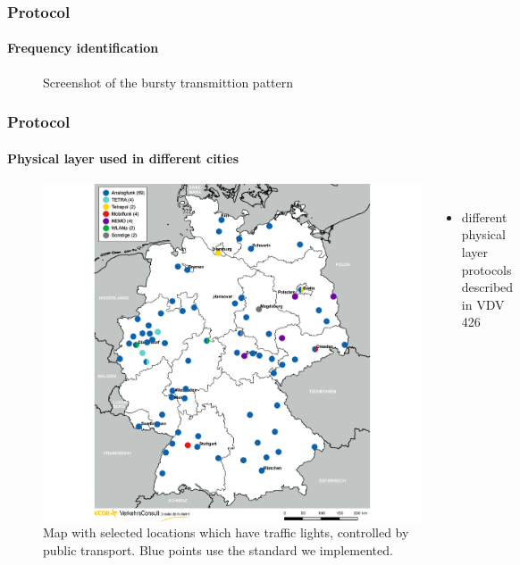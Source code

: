 \documentclass[aspectratio=169]{beamer}
\begin{document}

\begin{frame}
\frametitle{Protocol}
\framesubtitle{Frequency identification}
\begin{figure}
\centering
\missingfigure[figwidth=7cm]{}
\caption{Screenshot of the bursty transmittion pattern}
\end{figure}
\end{frame}


\begin{frame}
\frametitle{Protocol}
\framesubtitle{Physical layer used in different cities}
\begin{figure}
\begin{columns}
\centering
\includegraphics[height=0.8\textheight]{figs/vcdb-map-ampelbeeinflussung.png}
\caption{Map with selected locations which have traffic lights, controlled by public transport. Blue points use the standard we implemented.}
\vspace{0.5cm}
\begin{itemize}
	\item different physical layer protocols described in VDV 426
\end{itemize}
\end{columns}
\end{figure}
\end{frame}
\end{document}
